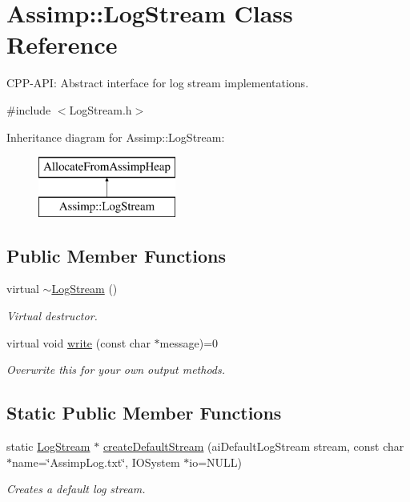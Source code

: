 \hypertarget{class_assimp_1_1_log_stream}{\section{Assimp\-:\-:Log\-Stream Class Reference}
\label{class_assimp_1_1_log_stream}
}


C\-P\-P-\/\-A\-P\-I\-: Abstract interface for log stream implementations.  




{\ttfamily \#include $<$Log\-Stream.\-h$>$}

Inheritance diagram for Assimp\-:\-:Log\-Stream\-:\begin{figure}[H]
\begin{center}
\leavevmode
\includegraphics[height=2.000000cm]{class_assimp_1_1_log_stream}
\end{center}
\end{figure}
\subsection*{Public Member Functions}
\begin{DoxyCompactItemize}
\item 
\hypertarget{class_assimp_1_1_log_stream_a72cabcadc78dcbdd54b5641703057ee7}{virtual \hyperlink{class_assimp_1_1_log_stream_a72cabcadc78dcbdd54b5641703057ee7}{$\sim$\-Log\-Stream} ()}\label{class_assimp_1_1_log_stream_a72cabcadc78dcbdd54b5641703057ee7}

\begin{DoxyCompactList}\small\item\em Virtual destructor. \end{DoxyCompactList}\item 
virtual void \hyperlink{class_assimp_1_1_log_stream_ab0bfcb5ab9988ef65d7222a50f6e8d37}{write} (const char $\ast$message)=0
\begin{DoxyCompactList}\small\item\em Overwrite this for your own output methods. \end{DoxyCompactList}\end{DoxyCompactItemize}
\subsection*{Static Public Member Functions}
\begin{DoxyCompactItemize}
\item 
static \hyperlink{class_assimp_1_1_log_stream}{Log\-Stream} $\ast$ \hyperlink{class_assimp_1_1_log_stream_a6b358a4a79b2e9ba2025e10d3e9405e3}{create\-Default\-Stream} (ai\-Default\-Log\-Stream stream, const char $\ast$name=\char`\"{}Assimp\-Log.\-txt\char`\"{}, I\-O\-System $\ast$io=N\-U\-L\-L)
\begin{DoxyCompactList}\small\item\em Creates a default log stream. \end{DoxyCompactList}\end{DoxyCompactItemize}
